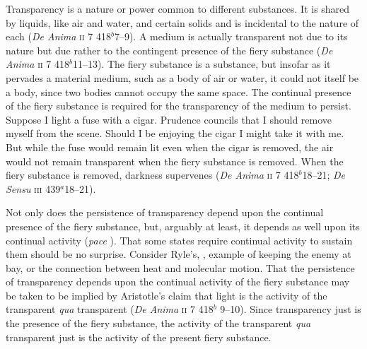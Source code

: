 Transparency is a nature or power common to different substances. It is shared by liquids, like air and water, and certain solids and is incidental to the nature of each (\emph{De Anima} \textsc{ii} 7 418\( ^{b} \)7--9). A medium is actually transparent not due to its nature but due rather to the contingent presence of the fiery substance (\emph{De Anima} \textsc{ii} 7 418\( ^{b} \)11--13). The fiery substance is a substance, but insofar as it pervades a material medium, such as a body of air or water, it could not itself be a body, since two bodies cannot occupy the same space. The continual presence of the fiery substance is required for the transparency of the medium to persist. Suppose I light a fuse with a cigar. Prudence councils that I should remove myself from the scene. Should I be enjoying the cigar I might take it with me. But while the fuse would remain lit even when the cigar is removed, the air would not remain transparent when the fiery substance is removed. When the fiery substance is removed, darkness supervenes (\emph{De Anima} \textsc{ii} 7 418\( ^{b} \)18--21; \emph{De Sensu} \textsc{iii} 439\( ^{a} \)18--21). 

Not only does the persistence of transparency depend upon the continual presence of the fiery substance, but, arguably at least, it depends as well upon its continual activity (\emph{pace} \citealt[]{Sambursky:1958aa} \citealt[424]{Burnyeat:1995fk}). That some states require continual activity to sustain them should be no surprise. Consider Ryle's, \citeyearpar[149]{Ryle:1949qr}, example of keeping the enemy at bay, or the connection between heat and molecular motion. That the persistence of transparency depends upon the continual activity of the fiery substance may be taken to be implied by Aristotle's claim that light is the activity of the transparent \emph{qua} transparent (\emph{De Anima} \textsc{ii} 7 418\( ^{b} \) 9--10). Since transparency just is the presence of the fiery substance, the activity of the transparent \emph{qua} transparent just is the activity of the present fiery substance.


